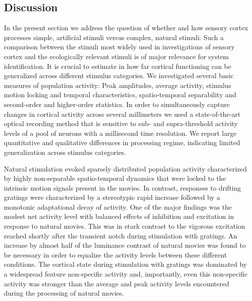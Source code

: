 \subsection{Discussion} 

In the present section we address the question of whether and how sensory
cortex processes simple, artificial stimuli versus complex, natural stimuli.
Such a comparison between the stimuli most widely used in investigations of
sensory cortex and the ecologically relevant stimuli is of major relevance for
system identification. It is crucial to estimate in how far cortical
functioning can be generalized across different stimulus categories. We
investigated several basic measures of population activity: Peak amplitudes,
average activity, stimulus motion locking and temporal characteristics,
spatio-temporal separability and second-order and higher-order statistics. In
order to simultaneously capture changes in cortical activity across several
millimeters we used a state-of-the-art optical recording method that is
sensitive to sub- and supra-threshold activity levels of a \linebreak \newpage
pool of neurons with a millisecond time resolution. We report large
quantitative and qualitative differences in processing regime, indicating
limited generalization across stimulus categories.  

Natural stimulation evoked sparsely distributed population activity
characterized by highly non-separable spatio-temporal dynamics that were
locked to the intrinsic motion signals present in the movies. In contrast,
responses to drifting gratings were characterized by a stereotypic rapid
increase followed by a monotonic adaptational decay of activity. One of the
major findings was the modest net activity level with balanced effects of
inhibition and excitation in response to natural movies. This was in stark
contrast to the vigorous excitation reached shortly after the transient
notch during stimulation with gratings. An increase by almost half of the
luminance contrast of natural movies was found to be necessary in order to
equalize the activity levels between these different conditions. The
cortical state during stimulation with gratings was dominated by a
widespread feature non-specific activity and, importantly, even this
non-specific activity was stronger than the average and peak activity
levels encountered during the processing of natural movies.


